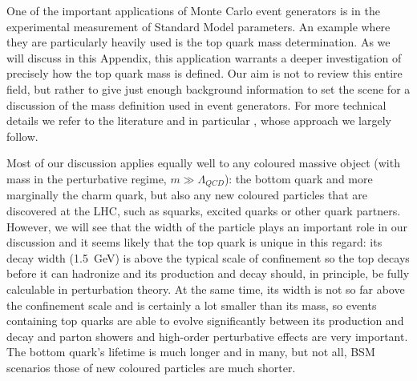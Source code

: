 One of the important applications of Monte Carlo event generators is in
the experimental measurement of Standard Model parameters.  An example
where they are particularly heavily used is the top quark mass
determination.  As we will discuss in this Appendix, this application
warrants a deeper investigation of precisely how the top quark mass is
defined.  Our aim is not to review this entire field, but rather to give
just enough background information to set the scene for a discussion
of the mass definition used in event generators.  For more technical
details we refer to the literature and in particular
\cite{Hoang:2008yj,Fleming:2007qr,Fleming:2007xt,Jain:2008gb},
whose approach we largely follow.

Most of our discussion applies equally well to any coloured massive
object (\ie with mass in the perturbative regime, $m\gg\Lambda_{QCD}$):
the bottom quark and more marginally the charm quark, but also any new
coloured particles
that are discovered at the LHC, such as squarks, excited quarks or other
quark partners.  However, we will see that the width of the particle
plays an important role in our discussion and it seems likely that the
top quark is unique in this regard: its decay width (1.5~GeV) is above
the typical scale of confinement so the top decays before it can
hadronize and its production and decay should, in principle, be fully
calculable in perturbation theory.  At the same time, its width is not
so far above the confinement scale and is certainly a lot smaller than
its mass, so events containing top quarks are able to evolve
significantly between its production and decay and parton showers and
high-order perturbative effects are very important.  The bottom quark's
lifetime is much longer and in many, but not all, BSM scenarios those of
new coloured particles are much shorter.

